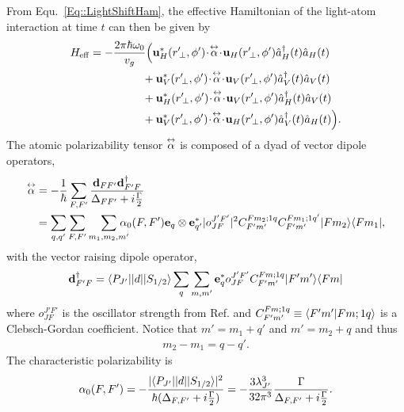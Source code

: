 From Equ.~\eqref{Eq::LightShiftHam}, the effective Hamiltonian of the light-atom interaction at time $ t $ can then be given by
\begin{align}  
	H_{\rm eff}   = -\frac{2\pi \hbar \omega_0}{ v_g } &\Big( \mathbf{u}^*_H(r^\prime\!_\perp, \phi') 
	\!\cdot\! 
	\tensor{\alpha} \!\cdot\! \mathbf{u}_{H}(r^\prime\!_\perp, \phi') \hat{a}\dg_H(t) \hat{a}_H(t) \nonumber\\
	&\!\! +  
	\mathbf{u}^*_V(r^\prime\!_\perp, \phi')\! \cdot\! 
	\tensor{\alpha} \!\cdot\! \mathbf{u}_{V}(r^\prime\!_\perp, \phi') \hat{a}\dg_V(t) \hat{a}_V(t) \nonumber\\
	&\!\! + \mathbf{u}^*_H(r^\prime\!_\perp, \phi')\! \cdot\! \tensor{\alpha}\! \cdot\! 
	\mathbf{u}_{V}(r^\prime\!_\perp, \phi') \hat{a}\dg_H(t) \hat{a}_V(t) \nonumber\\
	&\!\! + \mathbf{u}^*_V(r^\prime\!_\perp, \phi') \!\cdot\! \tensor{\alpha}\! \cdot\! 
	\mathbf{u}_{H}(r^\prime\!_\perp, 
	\phi') \hat{a}\dg_V(t) \hat{a}_H(t) 
	\Big).  \label{eq:LightShiftHam_CG}
\end{align}
The atomic polarizability tensor $\overset{\leftrightarrow}{\alpha}$ is composed of a dyad of vector dipole operators,    
\begin{align}
	\overset{\leftrightarrow}{\alpha} & =  - \frac{1}{\hbar}  \sum_{F,F'} \frac{ \mathbf{d}_{FF'} \mathbf{d}^\dagger_{F'F} 
	}{\Delta_{FF'}+i\frac{\Gamma}{2} } \\
		& = \sum_{q,q'}  \sum_{F,F'} \sum_{m_1, m_2, m'} \!\!\!\!\!\! \alpha_0(F,F') \mathbf{e}_q \otimes 
		\mathbf{e}^*_{q'} | o^{J'F'}_{JF} |^2 C^{Fm_2;1q}_{F'm'} C^{Fm_1;1q'}_{F'm'} \lvert{F m_2}\rangle\langle{F m_1}\rvert,
\end{align}
with the vector raising  dipole operator,
\begin{align}
	\mathbf{d}^\dagger_{F'F} =  \langle{P_{J'}}\rvert| d |\lvert{S_{1/2}}\rangle \sum_q \sum_{m,m'} \mathbf{e}_q^* 
	o^{J'F'}_{JF} C^{Fm;1q}_{F'm'} \lvert{F'm'}\rangle\langle{Fm}\rvert
\end{align}
where $o^{J'F'}_{JF}$ is the oscillator strength from Ref. \cite{Deutsch2010a} and $C^{Fm;1q}_{F'm'} 
\equiv 
\langle{F'm'}|{Fm;1q}\rangle$ is a Clebsch-Gordan coefficient. 
Notice that $m' = m_1 + q'$ and $m' = m_2 + q$ and thus
\begin{align}
	m_2 - m_1 = q-q'.
\end{align}
The characteristic polarizability is
\begin{align} \label{eq:CharacteristicPolarizability}
	\alpha_0(F,F') = - \frac{ |\bra{P_{J'}}| d |\ket{S_{1/2}}|^2 }{\hbar (\Delta_{F,F'}+i\frac{\Gamma}{2})} = - 
	\frac{3 
	\lambda_{J'}^3}{32 \pi^3} \frac{\Gamma}{\Delta_{F,F'}+i\frac{\Gamma}{2}}.
\end{align}

